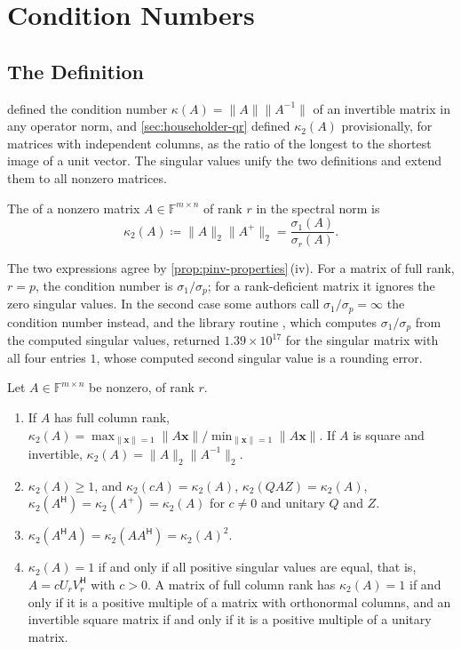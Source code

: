 \section{Condition Numbers}
\label{sec:svd-condition}

\subsection{The Definition}

 defined the condition number $\kappa(A)=\|A\|\|A^{-1}\|$ of an invertible matrix in any operator norm, and \cref{sec:householder-qr} defined $\kappa_2(A)$ provisionally, for matrices with independent columns, as the ratio of the longest to the shortest image of a unit vector. The singular values unify the two definitions and extend them to all nonzero matrices.

\begin{definition}
\label{def:kappa2}
The  of a nonzero matrix $A\in\mathbb F^{m\times n}$ of rank $r$ in the spectral norm is
\[
\kappa_2(A)\coloneqq\|A\|_2\|A^+\|_2=\frac{\sigma_1(A)}{\sigma_r(A)} .
\]
\end{definition}

The two expressions agree by \cref{prop:pinv-properties}\,(iv). For a matrix of full rank, $r=p$, the condition number is $\sigma_1/\sigma_p$; for a rank-deficient matrix it ignores the zero singular values. In the second case some authors call $\sigma_1/\sigma_p=\infty$ the condition number instead, and the library routine , which computes $\sigma_1/\sigma_p$ from the computed singular values, returned $1.39\times10^{17}$ for the singular matrix with all four entries $1$, whose computed second singular value is a rounding error.

\begin{proposition}
\label{prop:kappa-properties}
Let $A\in\mathbb F^{m\times n}$ be nonzero, of rank $r$.
\begin{enumerate}
\item If $A$ has full column rank, $\kappa_2(A)=\max_{\|\mathbf x\|=1}\|A\mathbf x\|/\min_{\|\mathbf x\|=1}\|A\mathbf x\|$. If $A$ is square and invertible, $\kappa_2(A)=\|A\|_2\|A^{-1}\|_2$.
\item $\kappa_2(A)\ge1$, and $\kappa_2(cA)=\kappa_2(A)$, $\kappa_2(QAZ)=\kappa_2(A)$, $\kappa_2(A^{\mathsf H})=\kappa_2(A^+)=\kappa_2(A)$ for $c\ne0$ and unitary $Q$ and $Z$.
\item $\kappa_2(A^{\mathsf H}A)=\kappa_2(AA^{\mathsf H})=\kappa_2(A)^2$.
\item $\kappa_2(A)=1$ if and only if all positive singular values are equal, that is, $A=cU_rV_r^{\mathsf H}$ with $c>0$. A matrix of full column rank has $\kappa_2(A)=1$ if and only if it is a positive multiple of a matrix with orthonormal columns, and an invertible square matrix if and only if it is a positive multiple of a unitary matrix.
\end{enumerate}
\end{proposition}

